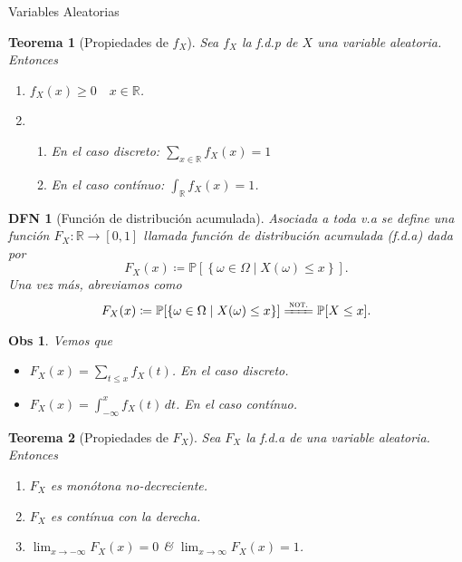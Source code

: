 \documentclass[a4paper]{article}
\newtheorem{definition}{DFN}
\theoremstyle{mytheoremstyle}
\newtheorem{theorem}{Teorema}
\newtheorem*{obs}{Obs}
\newcommand{\IP}{\mathbb{P}}
\newcommand{\R}{\mathbb{R}}
\newcommand{\1}{\mathds{1}}
\providecommand{\set}[1]{\left\{#1\right\}}
\begin{document}
\begin{multicols*}{3}
\begin{roundbox}{Variables Aleatorias}
    \begin{theorem}[Propiedades de $f_X$]
        Sea $f_X$ la f.d.p de $X$ una variable aleatoria. Entonces 
    \begin{enumerate}
        \item $f_X (x) \geq 0 \quad x \in \R$.
        \item 
        \begin{enumerate}
            \item En el caso discreto: $\sum_{x \in \R} f_X (x) = 1$
            \item En el caso contínuo: $\int_\R f_X (x) = 1$.
        \end{enumerate}
    \end{enumerate}
    \end{theorem}

    \begin{definition}[Función de distribución acumulada] 
        Asociada a toda v.a se define una función $F_X : \R \to [0,1]$ llamada función de distribución acumulada (f.d.a) dada por 
        \[
            F_X (x) \coloneqq   \IP[\set{\omega \in \Omega \mid X(\omega) \leq x}].
        \]
        Una vez más, abreviamos como 
        \[
            F_X (x) \coloneqq   \IP[\set{\omega \in \Omega \mid X(\omega) \leq x}] \xlongequal{\text{\scshape not.}} \IP[X \leq x].
        \]
    \end{definition}

    \begin{obs}
        Vemos que 
        \begin{itemize}
            \item $F_X (x) = \sum_{t \leq x} f_X (t)$. En el caso discreto. 
            \item $F_X (x) = \int_{-\infty}^{x} f_X(t) \, dt$. En el caso contínuo.
        \end{itemize}
    \end{obs}

    \begin{theorem}[Propiedades de $F_X$]
        Sea $F_X$ la f.d.a de una variable aleatoria. Entonces 
        \begin{enumerate}
            \item $F_X$ es monótona no-decreciente.
            \item $F_X$ es contínua con la derecha. 
            \item $\lim_{x \to -\infty} F_X (x) = 0$ \& $\lim_{x \to \infty} F_X (x) = 1$.
        \end{enumerate}
    \end{theorem}
\end{roundbox}


\end{multicols*}
\end{document}
